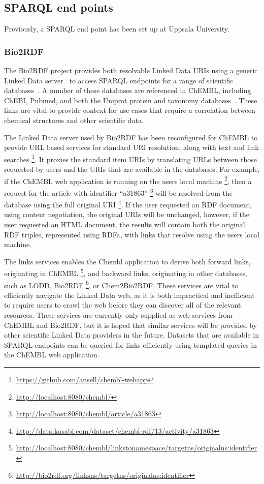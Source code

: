 \documentclass[sw]{iosart2c}
\begin{document}
\subsection{SPARQL end points}

Previously, a SPARQL end point has been set up at Uppsala University.

\subsubsection{Bio2RDF}


The Bio2RDF project provides both resolvable Linked Data URIs using a generic Linked Data
server~\cite{Ansell2011} to access SPARQL endpoints for a range of scientific databases~\cite{Belleau2008}.
A number of these databases are referenced in ChEMBL, including ChEBI, Pubmed, and both the
Uniprot protein and taxonomy databases~\cite{TheUniProtConsortium2010}. These links are
vital to provide context for use cases that require a correlation between chemical
structures and other scientific data. 

The Linked Data server used by Bio2RDF has been reconfigured for ChEMBL to provide URL
based services for standard URI resolution, along with text and link searches
\footnote{\url{https://github.com/ansell/chembl-webapp}}. It proxies the standard item
URIs by translating URLs between those requested by users and the URIs that are available
in the databases. For example, if the ChEMBL web application is running on the users
local machine \footnote{\url{http://localhost:8080/chembl/}}, then a request for the
article with identifier ``a31863'' \footnote{\url{http://localhost:8080/chembl/article/a31863}}
will be resolved from the database using the full original URI
\footnote{\url{http://data.kasabi.com/dataset/chembl-rdf/13/activity/a31863}}. If the
user requested an RDF document, using content negotiation, the original URIs will be unchanged,
however, if the user requested an HTML document, the results will contain both the
original RDF triples, represented using RDFa, with links that resolve using the users local machine.

The links services enables the Chembl application to derive both forward links, originating in
ChEMBL \footnote{\url{http://localhost:8080/chembl/linkstonamespace/targetns/originalns:identifier}},
and backward links, originating in other databases, such as LODD, Bio2RDF
\footnote{\url{http://bio2rdf.org/linksns/targetns/originalns:identifier}}, or Chem2Bio2RDF.
These services are vital to efficiently navigate the Linked Data web, as it is both
impractical and inefficient to require users to crawl the web before they can discover all of the
relevant resources. These services are currently only supplied as web services from ChEMBL and
Bio2RDF, but it is hoped that similar services will be provided by other scientific Linked Data
providers in the future. Datasets that are available in SPARQL endpoints can be queried for
links efficiently using templated queries in the ChEMBL web application.
\end{document}

